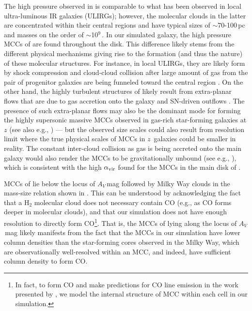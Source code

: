 \IfFileExists{emulateapjlegacy.cls}{\documentclass[iop]{emulateapjlegacy}}{\documentclass[iop]{emulateapj}}
\begin{document}
The high pressure observed in \flower is comparable to what has been observed in local ultra-luminous IR galaxies (ULIRGs); however, the molecular clouds in the latter are concentrated within their central regions and have typical sizes of $\sim$70-100\,pc and masses on the order of $\sim$10$^9$\,\Msun \citep{Downes98a, Sakamoto08a}. In our simulated galaxy, the high pressure MCCs of \flower are found throughout the disk. This difference likely stems from the different physical mechanisms giving rise to the formation (and thus the nature) of these molecular structures.
%
For instance, in local ULIRGs, they are likely form by shock compression and cloud-cloud collision after large amount of gas from the pair of progenitor galaxies are being funneled toward the central region \citep{Tan00a, Wu18a}.
On the other hand, the highly turbulent structures of \flower likely result from 
extra-planar flows that are due to gas accretion onto the galaxy and SN-driven outflows \citep{gallerani:2018,kohandel:2019}.
The presence of such extra-planar flows may also be the 
dominant mode for forming the highly supersonic massive MCCs observed in gas-rich star-forming galaxies at $z$ (see also e.g., \citealt{Swinbank11a}) --- but the observed size scales could also result from resolution limit where the true physical scales of MCCs in $z$\, galaxies could be smaller in reality.
%
The constant inter-cloud collision as gas is being accreted onto the main galaxy would also render
the MCCs to be gravitationally unbound (see e.g., \citealt{Dobbs11a}), which is
consistent with the high $\alpha_{\rm vir}$ found for the MCCs in the main disk of \flower.

MCCs of \flower lie below the locus of $A_V$\,mag followed by Milky Way clouds in the mass-size relation shown in . This can be understood by acknowledging the fact that a H$_2$ molecular cloud does not necessary contain CO (e.g., as CO forms deeper in molecular clouds), and that our simulation does not have enough resolution to directly form CO\footnote{In fact, to form CO and make predictions for CO line emission in the work presented by \citet{Vallini18a}, we model the internal structure of MCC within each cell in our simulation.}.
%
That is, the MCCs of \flower lying along the locus of $A_V$\,mag likely manifests from the fact that the MCCs in our simulation have lower column densities than the star-forming cores observed in the Milky Way, which are observationally well-resolved within an MCC, and indeed, have sufficient column density to form CO.
\end{document}
